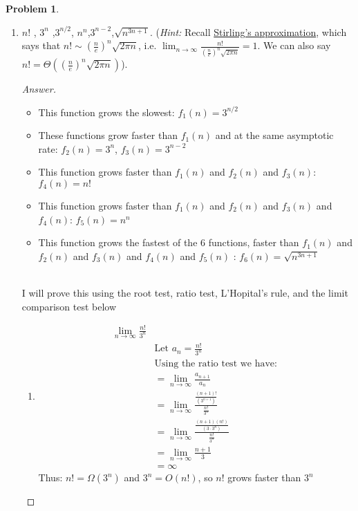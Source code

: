 \documentclass[11pt]{article}
\theoremstyle{definition}
\theoremstyle{definition}
\newtheorem{required}{Problem}
\theoremstyle{definition}
\begin{document}
\begin{required}
\begin{enumerate}[label=(\alph*)]
\subsection{Problem 3\ref{2b}}
        \item \label{2b} $n!$ , \qquad $3^n$ ,\qquad  $3^{n/2}$, \qquad  $n^n$,\qquad $3^{n-2}$,\qquad  $\sqrt{n^{3n+1}}$. (\emph{Hint:} Recall \href{https://en.wikipedia.org/wiki/Stirling\%27s_approximation}{Stirling's approximation}, which says that $n! \sim \left(\frac{n}{e}\right)^n \sqrt{2 \pi n}$, i.e. $\lim_{n \to \infty} \frac{n!}{\left(\frac{n}{e}\right)^n \sqrt{2 \pi n}} = 1$. We can also say $n! = \Theta (\left(\frac{n}{e}\right)^n \sqrt{2 \pi n} )$).
        \begin{proof}[Answer]
\begin{itemize}
\item This function grows the slowest: $f_{1}(n)= 3^{n/2}$
\item These functions grow faster than $f_{1}(n)$ and at the same asymptotic rate: $f_{2}(n)= 3^n$, $f_{3}(n)=3^{n-2}$
\item This function grows faster than $f_{1}(n)$ and $f_{2}(n)$ and $f_{3}(n)$: $f_{4}(n)= n!$ 
\item This function grows faster than $f_{1}(n)$ and $f_{2}(n)$ and $f_{3}(n)$ and $f_{4}(n)$: $f_{5}(n)= n^n$ 
\item This function grows the fastest of the 6 functions, faster than $f_{1}(n)$ and $f_{2}(n)$ and $f_{3}(n)$ and $f_{4}(n)$ and $f_{5}(n)$ : $f_{6}(n)=\sqrt{n^{3n+1}}$
\end{itemize}


\noindent \\ I will prove this using the root test, ratio test, L'Hopital's rule, and the limit comparison test below
\begin{enumerate}

\item
\begin{align*}
\lim_{n \to \infty} \frac{n!}{3^n} \\
&\text{Let } a_n=  \frac{n!}{3^n} \\
&\text{Using the ratio test we have: } \\
&=\lim_{n \to \infty} \frac{a_{n+1}}{a_n} \\
&=\lim_{n \to \infty} \frac{\frac{(n+1)!}{(3^{n+1})}}{ \frac{n!}{3^n} } \\
&=\lim_{n \to \infty} \frac{\frac{(n+1)(n!)}{(3\cdot 3^n)}}{ \frac{n!}{3^n} } \\
&=\lim_{n \to \infty} \frac{n+1}{3} \\
&= \infty
\end{align*}
Thus: $n!= \Omega(3^n)$ and $3^n=O(n!)$, so $n!$ grows faster than $3^n$


\end{enumerate}
\end{proof}
\end{enumerate}
\end{required}
\end{document}
